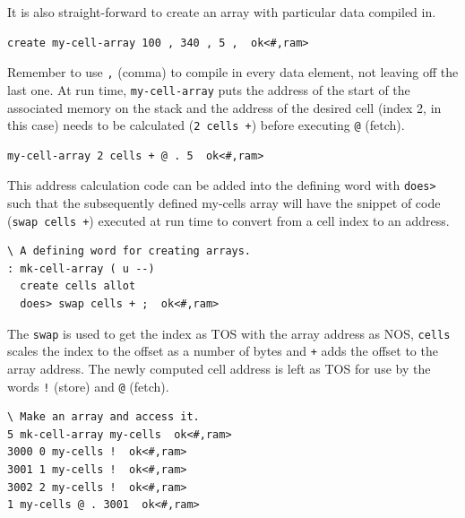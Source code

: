 \documentclass[12pt,a4paper]{article}
\begin{document}
\medskip
It is also straight-forward to create an array with particular data compiled in.
\begin{verbatim}
create my-cell-array 100 , 340 , 5 ,  ok<#,ram>
\end{verbatim}
Remember to use \verb!,! (comma) to compile in every data element, not leaving off the last one.
At run time, \verb!my-cell-array! puts the address of the start of the associated memory
on the stack and the address of the desired cell (index 2, in this case) 
needs to be calculated (\verb!2 cells +!) before executing \verb!@! (fetch).
\begin{verbatim}
my-cell-array 2 cells + @ . 5  ok<#,ram>
\end{verbatim}
This address calculation code can be added into the defining word with \verb!does>!
such that the subsequently defined my-cells array will have the snippet of code (\verb!swap cells +!)
executed at run time to convert from a cell index to an address.
\begin{verbatim}
\ A defining word for creating arrays.
: mk-cell-array ( u --) 
  create cells allot 
  does> swap cells + ;  ok<#,ram>
\end{verbatim}
The \verb!swap! is used to get the index as TOS with the array address as NOS,
\verb!cells! scales the index to the offset as a number of bytes and \verb!+! adds the
offset to the array address.
The newly computed cell address is left as TOS for use by the words \verb?!? (store) and \verb!@! (fetch). 
\begin{verbatim}
\ Make an array and access it.
5 mk-cell-array my-cells  ok<#,ram>
3000 0 my-cells !  ok<#,ram>
3001 1 my-cells !  ok<#,ram>
3002 2 my-cells !  ok<#,ram>
1 my-cells @ . 3001  ok<#,ram>
\end{verbatim}
\end{document}
